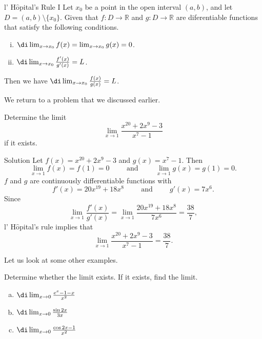 \begin{theorem}[label=thm230216_16]{l' H$\hat{\text{o}}$pital's Rule I}
Let $x_0$ be a point in the open interval $(a, b)$, and let   $D=(a,b)\setminus\{x_0\}$. Given that $f:D\to\mathbb{R}$ and $g:D\to\mathbb{R}$ are diferentiable  functions that satisfy the following conditions.
\begin{enumerate}[(i)]
\item $\di\lim_{x\rightarrow x_0}f(x)=\lim_{x\rightarrow x_0}g(x)=0$.
\item  $\di\lim_{x\rightarrow x_0}\frac{f'(x)}{g'(x)}=L$.

\end{enumerate}
Then  we have $\di \lim_{x\rightarrow x_0}\frac{f(x)}{g(x)}=L$.
\end{theorem}
 We return to a problem that we discussed earlier.
\begin{example}{}Determine the limit \[\lim_{x\to 1}\frac{x^{20}+2x^9-3}{x^7-1}\] if it exists.
\end{example}
\begin{solution}{Solution}
Let $f(x)=x^{20}+2x^9-3$ and $g(x)=x^7-1$. Then
\[\lim_{x\to 1}f(x)=f(1)=0\hspace{1cm} \text{and}\hspace{1cm} \lim_{x\to 1}g(x)=g(1)=0.\]
$f$ and $g$ are continuously differentiable functions with
\[f'(x)=20x^{19}+18x^8\hspace{1cm} \text{and}\hspace{1cm}  g'(x)=7x^6.\]
Since\[\lim_{x\to 1}\frac{f'(x)}{g'(x)}=\lim_{x\to 1}\frac{20x^{19}+18x^8}{7x^6}=\frac{38}{7},\]
l' H$\hat{\text{o}}$pital's rule implies that
\[\lim_{x\to 1}\frac{x^{20}+2x^9-3}{x^7-1}=\frac{38}{7}.\]
\end{solution}
Let us look at some other examples.
\begin{example}{}
Determine whether the limit exists. If it exists, find the limit.
\begin{enumerate}[(a)]
\item
$\di \lim_{x\to 0}\frac{e^x-1-x}{x^2}$
\item $\di \lim_{x\to 0}\frac{\sin 2x}{3x}$
\item $\di \lim_{x\to 0}\frac{\cos 2x-1}{x^2}$
\end{enumerate}
\end{example}
